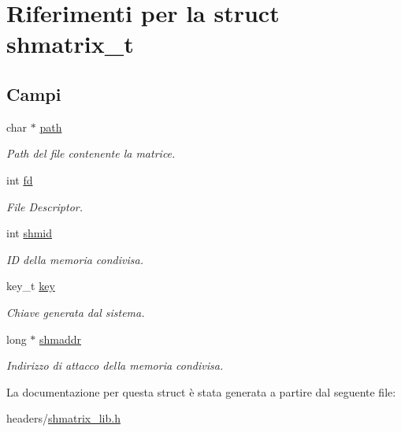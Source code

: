 \hypertarget{structshmatrix__t}{}\section{Riferimenti per la struct shmatrix\+\_\+t}
\label{structshmatrix__t}
\subsection*{Campi}
\begin{DoxyCompactItemize}
\item 
\mbox{\label{structshmatrix__t_a3695e571dac87ca2667854366b54141e}} 
char $\ast$ \hyperlink{structshmatrix__t_a3695e571dac87ca2667854366b54141e}{path}
\begin{DoxyCompactList}\small\item\em Path del file contenente la matrice. \end{DoxyCompactList}\item 
\mbox{\label{structshmatrix__t_aa57d5cb8579cc4eedc468502def8c2e1}} 
int \hyperlink{structshmatrix__t_aa57d5cb8579cc4eedc468502def8c2e1}{fd}
\begin{DoxyCompactList}\small\item\em File Descriptor. \end{DoxyCompactList}\item 
\mbox{\label{structshmatrix__t_a6fafeba2b1aae73a36fda9a012a49044}} 
int \hyperlink{structshmatrix__t_a6fafeba2b1aae73a36fda9a012a49044}{shmid}
\begin{DoxyCompactList}\small\item\em ID della memoria condivisa. \end{DoxyCompactList}\item 
\mbox{\label{structshmatrix__t_a1a81078d2e7a94e8ba6d3a98ac1a4155}} 
key\+\_\+t \hyperlink{structshmatrix__t_a1a81078d2e7a94e8ba6d3a98ac1a4155}{key}
\begin{DoxyCompactList}\small\item\em Chiave generata dal sistema. \end{DoxyCompactList}\item 
\mbox{\label{structshmatrix__t_a2e1a0de8e38807572e9bb1a53f8f598e}} 
long $\ast$ \hyperlink{structshmatrix__t_a2e1a0de8e38807572e9bb1a53f8f598e}{shmaddr}
\begin{DoxyCompactList}\small\item\em Indirizzo di attacco della memoria condivisa. \end{DoxyCompactList}\end{DoxyCompactItemize}


La documentazione per questa struct è stata generata a partire dal seguente file\+:\begin{DoxyCompactItemize}
\item 
headers/\hyperlink{shmatrix__lib_8h}{shmatrix\+\_\+lib.\+h}\end{DoxyCompactItemize}
